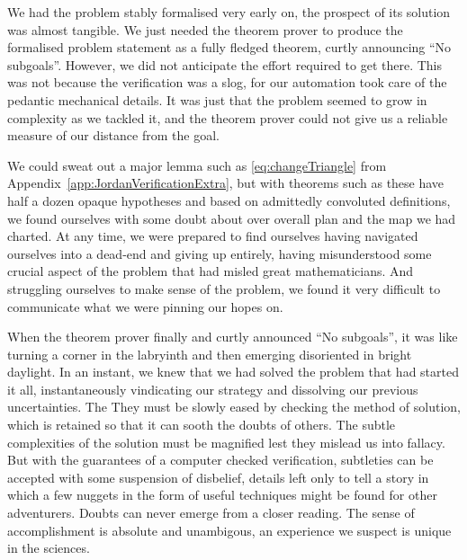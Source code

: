 We had the problem stably formalised very early on, the prospect of its solution was almost tangible. We just needed the theorem prover to produce the formalised problem statement as a fully fledged theorem, curtly announcing ``No subgoals''. However, we did not anticipate the effort required to get there. This was not because the verification was a slog, for our automation took care of the pedantic mechanical details. It was just that the problem seemed to grow in complexity as we tackled it, and the theorem prover could not give us a reliable measure of our distance from the goal.

We could sweat out a major lemma such as \ref{eq:changeTriangle} from Appendix~\ref{app:JordanVerificationExtra}, but with theorems such as these have half a dozen opaque hypotheses and based on admittedly convoluted definitions, we found ourselves with some doubt about over overall plan and the map we had charted. At any time, we were prepared to find ourselves having navigated ourselves into a dead-end and giving up entirely, having misunderstood some crucial aspect of the problem that had misled great mathematicians. And struggling ourselves to make sense of the problem, we found it very difficult to communicate what we were pinning our hopes on.

When the theorem prover finally and curtly announced ``No subgoals'', it was like turning a corner in the labryinth and then emerging disoriented in bright daylight. In an instant, we knew that we had solved the problem that had started it all, instantaneously vindicating our strategy and dissolving our previous uncertainties. The  They must be slowly eased by checking the method of solution, which is retained so that it can sooth the doubts of others. The subtle complexities of the solution must be magnified lest they mislead us into fallacy. But with the guarantees of a computer checked verification, subtleties can be accepted with some suspension of disbelief, details left only to tell a story in which a few nuggets in the form of useful techniques might be found for other adventurers. Doubts can never emerge from a closer reading. The sense of accomplishment is absolute and unambigous, an experience we suspect is unique in the sciences.

